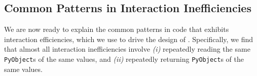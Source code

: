 \begin{table}[b]
    \centering
    \scriptsize
    \caption{Redundant loads and stores detect different categories of interaction inefficiencies.}
    \label{tab:patterns}
\end{table}


\subsection{Common Patterns in Interaction Inefficiencies}
\label{commonpatterns}

We are now ready to explain the common patterns in code that exhibits interaction efficiencies, which we use to drive the design of \tool. Specifically,  we find that almost all interaction inefficiencies involve \emph{(i)} repeatedly reading the same {\tt PyObject}s of the same values, and \emph{(ii)} repeatedly returning {\tt PyObject}s of the same values.

